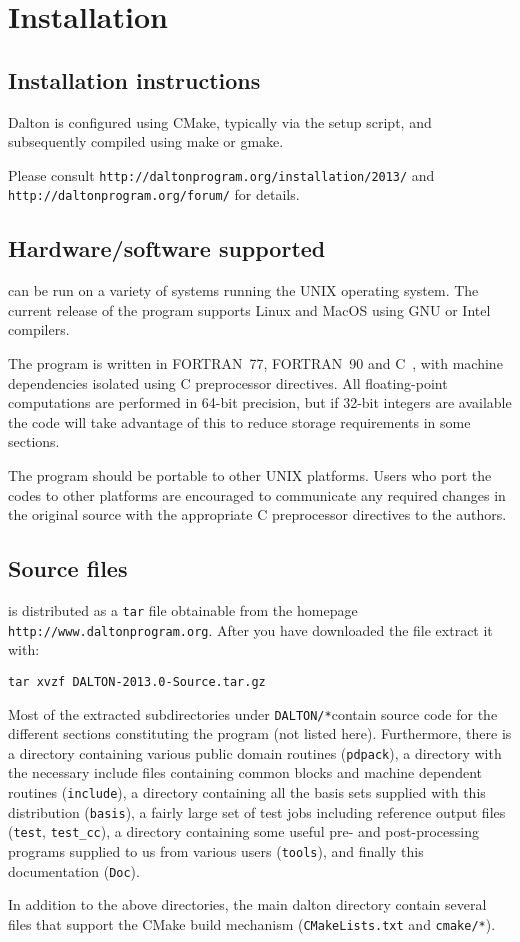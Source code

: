 \chapter{Installation}\label{ch:install}

\section{Installation instructions}

Dalton is configured using CMake, typically via the setup script,
and subsequently compiled using make or gmake.

Please consult \verb|http://daltonprogram.org/installation/2013/|
and \verb|http://daltonprogram.org/forum/| for details.

\section{Hardware/software
supported}\label{sec:hardsoft}

{\dalton} can be run on a variety of systems running the UNIX operating system.
The current release of the program supports Linux and
MacOS using GNU or Intel compilers.

The program is written in FORTRAN~77,
FORTRAN~90 and C~, with machine dependencies
isolated using C preprocessor directives.  All
floating-point computations are performed in 64-bit precision, but if 32-bit
integers are available the code will take advantage of this to reduce storage
requirements in some sections.

The program should be portable to other UNIX platforms.  Users
who port the codes to other platforms are encouraged to communicate any
required changes in the original source with the appropriate C preprocessor
directives to the authors.

\section{Source files}\label{sec:source}

{\dalton} is distributed as a \verb|tar| file obtainable from
the {\dalton} homepage  \verb|http://www.daltonprogram.org|.
After you have downloaded the file extract it with:
\begin{verbatim}
tar xvzf DALTON-2013.0-Source.tar.gz
\end{verbatim}
Most of the extracted subdirectories under \verb|DALTON/*|contain source code for the different
sections constituting the program (not listed here).  Furthermore, there is a
directory containing various public domain routines (\verb|pdpack|), a
directory with the necessary include files containing common blocks and machine
dependent routines (\verb|include|), a directory containing all the basis sets
supplied with this distribution (\verb|basis|), a fairly large set of test jobs
including reference output files (\verb|test|, \verb|test_cc|), a directory
containing some useful pre- and post-processing programs supplied to us from
various users (\verb|tools|), and finally this documentation (\verb|Doc|). 

In addition to the above directories, the main dalton directory contain several
files that support the CMake build mechanism (\verb|CMakeLists.txt| and \verb|cmake/*|).
